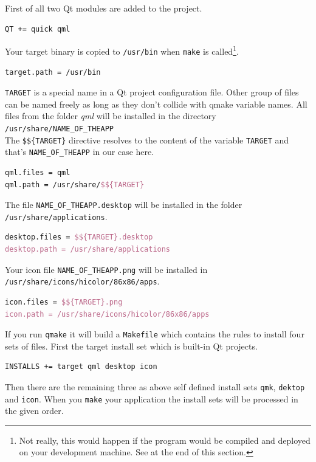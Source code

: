 %
First of all two Qt modules are added to the project.
%
\begin{lstlisting}[language=tex]
QT += quick qml
\end{lstlisting}
%
Your target binary is copied to \verb,/usr/bin, when \verb,make, is called\footnote{Not really, this would happen if the program would be compiled and deployed on your development machine. See at the end of this section.}.
%
\begin{lstlisting}[language=tex]
target.path = /usr/bin
\end{lstlisting}
%
\verb,TARGET, is a special name in a Qt project configuration file. Other group of files can be named freely as long as they don't collide with qmake variable names. All files from the folder \emph{qml} will be installed in the directory\\ \verb,/usr/share/NAME_OF_THEAPP, \\The \verb,$${TARGET}, directive resolves to the content of the variable \verb,TARGET, and that's \verb,NAME_OF_THEAPP, in our case here.
%
\begin{lstlisting}[language=tex]
qml.files = qml
qml.path = /usr/share/$${TARGET}
\end{lstlisting}
%
The file \verb,NAME_OF_THEAPP.desktop, will be installed in the folder\\ \verb,/usr/share/applications,.
%
\begin{lstlisting}[language=tex]
desktop.files = $${TARGET}.desktop
desktop.path = /usr/share/applications
\end{lstlisting}
%
Your icon file \verb,NAME_OF_THEAPP.png, will be installed in\\ \verb,/usr/share/icons/hicolor/86x86/apps,.
%
\begin{lstlisting}[language=tex]
icon.files = $${TARGET}.png
icon.path = /usr/share/icons/hicolor/86x86/apps
\end{lstlisting}
%
If you run \verb,qmake, it will build a \verb,Makefile, which contains the rules to install four sets of files. First the target install set  which is built-in Qt projects.
%
\begin{lstlisting}[language=tex]
INSTALLS += target qml desktop icon
\end{lstlisting}
%
Then there are the remaining three as above self defined install sets \verb,qmk,, \verb,dektop, and \verb,icon,. When you \verb,make, your application the install sets will be processed in the given order.

